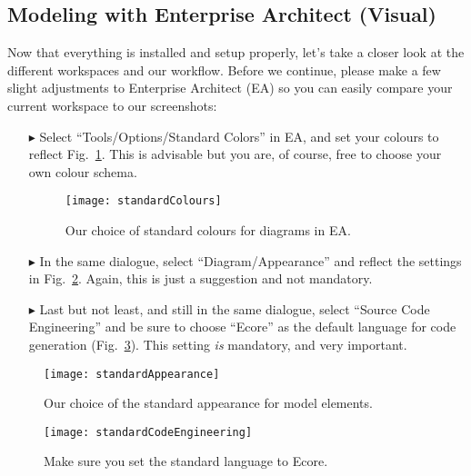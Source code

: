 \visHeader

\subsection{Modeling with Enterprise Architect (Visual)}

Now\hypertarget{projectStructure vis}{} that everything is installed and setup properly, let's take a closer look at the different workspaces and our workflow.
Before we continue, please make a few slight adjustments to Enterprise Architect (EA) so you can easily compare your current workspace to our screenshots:
\begin{itemize}

\item[$\blacktriangleright$] Select ``Tools/Options/Standard Colors'' in EA, and set your colours to reflect Fig.~\ref{fig_standardColoursEA}.
This is advisable but you are, of course, free to choose your own colour schema.

\begin{figure}[htbp]
  \centering
  \texttt{[image: standardColours]}
  \caption{Our choice of standard colours for diagrams in EA.}
  \label{fig_standardColoursEA}
\end{figure}

\item[$\blacktriangleright$] In the same dialogue, select ``Diagram/Appearance'' and reflect the settings in Fig.~\ref{fig_standardAppearanceEA}.
Again, this is just a suggestion and not mandatory.

\item[$\blacktriangleright$] Last but not least, and still in the same dialogue, select ``Source Code Engineering'' and be sure to choose ``Ecore'' as the default language for code generation (Fig.~\ref{fig_standardSCEEA}). This setting \emph{is} mandatory, and very important.
\end{itemize}

\begin{figure}[htbp]
  \centering
  \texttt{[image: standardAppearance]}
  \caption{Our choice of the standard appearance for model elements.}
  \label{fig_standardAppearanceEA}
\end{figure}

\begin{figure}[htbp]
    \centering
    \texttt{[image: standardCodeEngineering]}
    \caption{Make sure you set the standard language to Ecore.}
    \label{fig_standardSCEEA}
 \end{figure}
 

